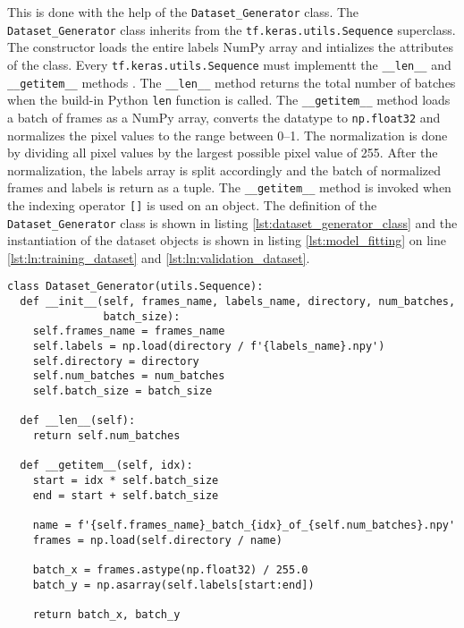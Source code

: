 This is done with the help of the \texttt{Dataset\_Generator} class.
The \texttt{Dataset\_Generator} class inherits from the \texttt{tf.keras.utils.Sequence} superclass.
The constructor loads the entire labels NumPy array and intializes the attributes of the class.
Every \texttt{tf.keras.utils.Sequence} must implementt the \texttt{\_\_len\_\_} and \texttt{\_\_getitem\_\_} methods \cite{}. %
The \texttt{\_\_len\_\_} method returns the total number of batches when the build-in Python \texttt{len} function is called.
The \texttt{\_\_getitem\_\_} method loads a batch of frames as a NumPy array, converts the datatype to \texttt{np.float32} and normalizes the pixel values to the range between \numrange{0}{1}.
The normalization is done by dividing all pixel values by the largest possible pixel value of \num{255}.
After the normalization, the labels array is split accordingly and the batch of normalized frames and labels is return as a tuple.
The \texttt{\_\_getitem\_\_} method is invoked when the indexing operator \texttt{[]} is used on an object.
The definition of the \texttt{Dataset\_Generator} class is shown in listing \ref{lst:dataset_generator_class} and the instantiation of the dataset objects is shown in listing \ref{lst:model_fitting} on line \ref{lst:ln:training_dataset} and \ref{lst:ln:validation_dataset}.

\begin{lstlisting}[style=python, caption={\texttt{Dataset\_Generator} class}, label=lst:dataset_generator_class]
class Dataset_Generator(utils.Sequence):
  def __init__(self, frames_name, labels_name, directory, num_batches,
               batch_size):
    self.frames_name = frames_name
    self.labels = np.load(directory / f'{labels_name}.npy')
    self.directory = directory
    self.num_batches = num_batches
    self.batch_size = batch_size

  def __len__(self):
    return self.num_batches

  def __getitem__(self, idx):
    start = idx * self.batch_size
    end = start + self.batch_size

    name = f'{self.frames_name}_batch_{idx}_of_{self.num_batches}.npy'
    frames = np.load(self.directory / name)

    batch_x = frames.astype(np.float32) / 255.0
    batch_y = np.asarray(self.labels[start:end])

    return batch_x, batch_y
\end{lstlisting}

